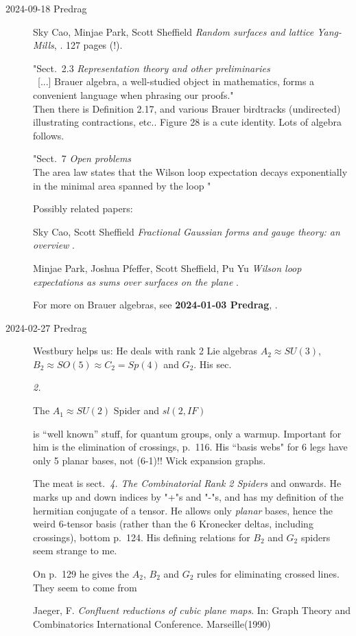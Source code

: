 \begin{description}
\item[2024-09-18 Predrag]
Sky Cao, Minjae Park, Scott Sheffield
\emph{Random surfaces and lattice Yang-Mills}, .
127 pages (!).

"Sect.~2.3 {\em Representation theory and other preliminaries}
\\
~[...]
Brauer algebra, a well-studied object in mathematics,
forms a convenient language when phrasing our proofs."
\\
Then there is Definition 2.17, and various Brauer birdtracks (undirected)
illustrating contractions, etc.. Figure 28 is a cute identity. Lots of
algebra follows.

"Sect.~7 {\em Open problems}
\\
The area law states that the Wilson loop expectation
decays exponentially in the minimal area spanned by the loop
"

Possibly related papers:

Sky Cao, Scott Sheffield
{\em Fractional Gaussian forms and gauge theory: an overview}
.

Minjae Park, Joshua Pfeffer, Scott Sheffield, Pu Yu
{\em Wilson loop expectations as sums over surfaces on the plane}
.

For more on Brauer algebras, see {\bf 2024-01-03 Predrag},
.


\item[2024-02-27 Predrag] Westbury helps us:
He deals with rank 2 {Lie} algebras $A_2\approx{SU(3)}$,
$B_2\approx{SO(5)}\approx{C_2=Sp(4)}$ and $G_2$.
His sec.~{\em 2.

The  $A_1\approx{SU(2)}$ Spider and $sl(2, IF)$}
is ``well known'' stuff, for quantum groups, only a warmup.
Important for him is the elimination of crossings, p.~116.
His ``basis webs" for 6 legs have only 5 planar bases, not (6-1)!!
Wick expansion graphs.


The meat is
sect.~{\em 4. The Combinatorial Rank 2 Spiders} and onwards. He marks
up and down indices by "+"s and "-"s, and has my definition
of the hermitian conjugate of a tensor. He allows only {\em planar} bases,
hence the weird 6-tensor basis (rather than the 6 Kronecker deltas,
including crossings), bottom p.~124.
His defining relations for $B_2$ and $G_2$ spiders seem strange to me.

On p.~129 he gives the $A_2$,  $B_2$ and $G_2$ rules for eliminating crossed lines.
They seem to come from

Jaeger, F. {\em Confluent reductions of cubic plane maps}. In: Graph Theory and Combinatorics
International Conference. Marseille(1990)


\end{description}
